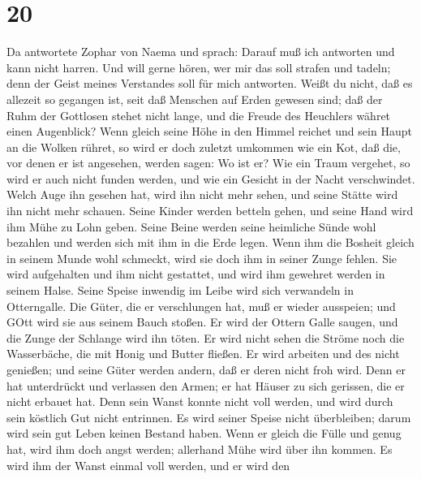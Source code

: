 \hypertarget{section-19}{%
\section{20}\label{section-19}}

 Da antwortete Zophar von Naema und sprach: 
Darauf muß ich antworten und kann nicht harren.  Und will
gerne hören, wer mir das soll strafen und tadeln; denn der Geist meines
Verstandes soll für mich antworten.  Weißt du nicht, daß es
allezeit so gegangen ist, seit daß Menschen auf Erden gewesen sind;
 daß der Ruhm der Gottlosen stehet nicht lange, und die
Freude des Heuchlers währet einen Augenblick?  Wenn gleich
seine Höhe in den Himmel reichet und sein Haupt an die Wolken rühret,
 so wird er doch zuletzt umkommen wie ein Kot, daß die, vor
denen er ist angesehen, werden sagen: Wo ist er?  Wie ein
Traum vergehet, so wird er auch nicht funden werden, und wie ein Gesicht
in der Nacht verschwindet.  Welch Auge ihn gesehen hat, wird
ihn nicht mehr sehen, und seine Stätte wird ihn nicht mehr schauen.
 Seine Kinder werden betteln gehen, und seine Hand wird ihm
Mühe zu Lohn geben.  Seine Beine werden seine heimliche
Sünde wohl bezahlen und werden sich mit ihm in die Erde legen.
 Wenn ihm die Bosheit gleich in seinem Munde wohl schmeckt,
wird sie doch ihm in seiner Zunge fehlen.  Sie wird
aufgehalten und ihm nicht gestattet, und wird ihm gewehret werden in
seinem Halse.  Seine Speise inwendig im Leibe wird sich
verwandeln in Otterngalle.  Die Güter, die er verschlungen
hat, muß er wieder ausspeien; und GOtt wird sie aus seinem Bauch stoßen.
 Er wird der Ottern Galle saugen, und die Zunge der
Schlange wird ihn töten.  Er wird nicht sehen die Ströme
noch die Wasserbäche, die mit Honig und Butter fließen.  Er
wird arbeiten und des nicht genießen; und seine Güter werden andern, daß
er deren nicht froh wird.  Denn er hat unterdrückt und
verlassen den Armen; er hat Häuser zu sich gerissen, die er nicht
erbauet hat.  Denn sein Wanst konnte nicht voll werden, und
wird durch sein köstlich Gut nicht entrinnen.  Es wird
seiner Speise nicht überbleiben; darum wird sein gut Leben keinen
Bestand haben.  Wenn er gleich die Fülle und genug hat,
wird ihm doch angst werden; allerhand Mühe wird über ihn kommen.
 Es wird ihm der Wanst einmal voll werden, und er wird den
